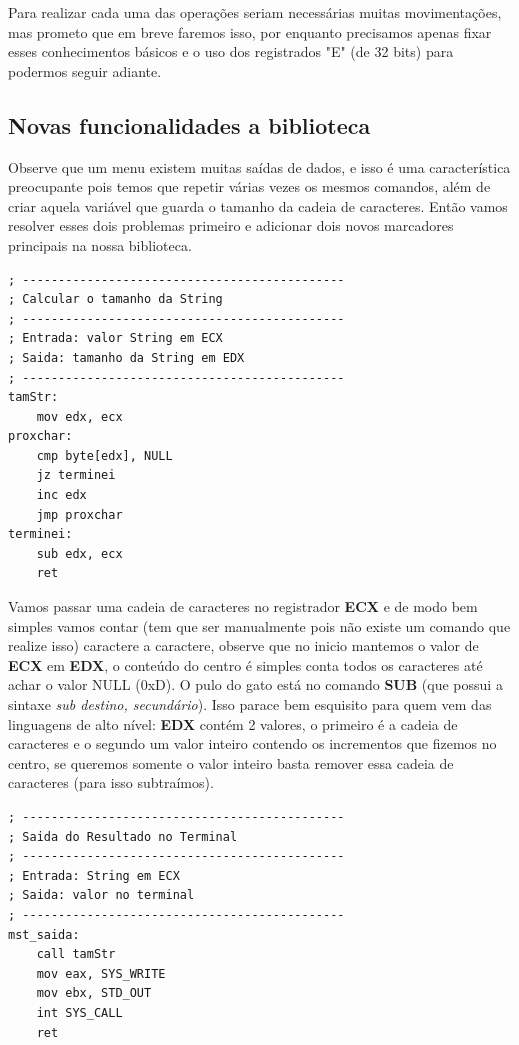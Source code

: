 Para realizar cada uma das operações seriam necessárias muitas movimentações, mas prometo que em breve faremos isso, por enquanto precisamos apenas fixar esses conhecimentos básicos e o uso dos registrados "E" (de 32 bits) para podermos seguir adiante.

\subsection{Novas funcionalidades a biblioteca}
Observe que um menu existem muitas saídas de dados, e isso é uma característica preocupante pois temos que repetir várias vezes os mesmos comandos, além de criar aquela variável que guarda o tamanho da cadeia de caracteres. Então vamos resolver esses dois problemas primeiro e adicionar dois novos marcadores principais na nossa biblioteca.

\begin{lstlisting}[]
; ---------------------------------------------
; Calcular o tamanho da String
; ---------------------------------------------
; Entrada: valor String em ECX
; Saida: tamanho da String em EDX
; ---------------------------------------------
tamStr:  
	mov edx, ecx
proxchar:
	cmp byte[edx], NULL
	jz terminei
	inc edx
	jmp proxchar  
terminei:
	sub edx, ecx
	ret
\end{lstlisting}

Vamos passar uma cadeia de caracteres no registrador \textbf{ECX} e de modo bem simples vamos contar (tem que ser manualmente pois não existe um comando que realize isso) caractere a caractere, observe que no inicio mantemos o valor de \textbf{ECX} em \textbf{EDX}, o conteúdo do centro é simples conta todos os caracteres até achar o valor NULL (0xD). O pulo do gato está no comando \textbf{SUB} (que possui a sintaxe \textit{sub destino, secundário}). Isso parace bem esquisito para quem vem das linguagens de alto nível: \textbf{EDX} contém 2 valores, o primeiro é a cadeia de caracteres e o segundo um valor inteiro contendo os incrementos que fizemos no centro, se queremos somente o valor inteiro basta remover essa cadeia de caracteres (para isso subtraímos).

\begin{lstlisting}[]
; ---------------------------------------------
; Saida do Resultado no Terminal
; ---------------------------------------------
; Entrada: String em ECX
; Saida: valor no terminal
; ---------------------------------------------
mst_saida:
	call tamStr
	mov eax, SYS_WRITE
	mov ebx, STD_OUT
	int SYS_CALL
	ret
\end{lstlisting}

